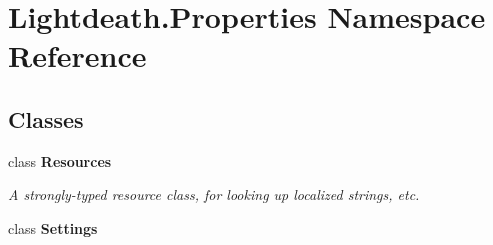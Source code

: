 \hypertarget{namespace_lightdeath_1_1_properties}{}\section{Lightdeath.\+Properties Namespace Reference}
\label{namespace_lightdeath_1_1_properties}
\subsection*{Classes}
\begin{DoxyCompactItemize}
\item 
class {\bfseries Resources}
\begin{DoxyCompactList}\small\item\em A strongly-\/typed resource class, for looking up localized strings, etc. \end{DoxyCompactList}\item 
class {\bfseries Settings}
\end{DoxyCompactItemize}
